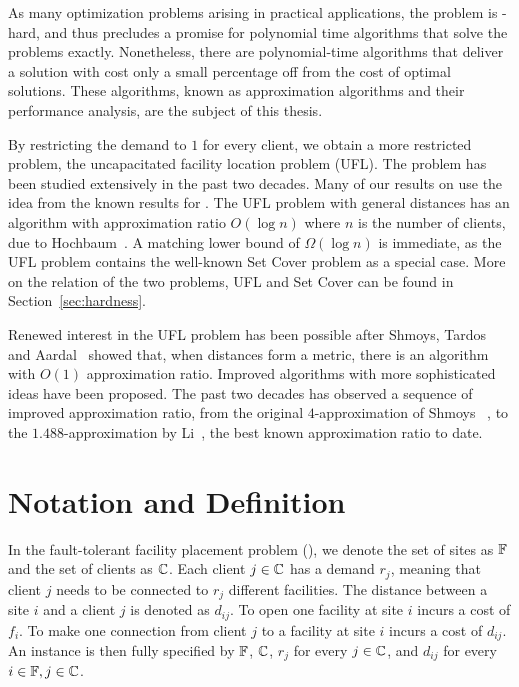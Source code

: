 \documentclass[oneside,final]{ucr}
\begin{document}
As many optimization problems arising in practical
applications, the {\FTFP} problem is \NP-hard, and thus
precludes a promise for polynomial time algorithms that
solve the problems exactly. Nonetheless, there are
polynomial-time algorithms that deliver a solution with cost
only a small percentage off from the cost of optimal
solutions. These algorithms, known as approximation
algorithms and their performance analysis, are the subject
of this thesis.

By restricting the demand to $1$ for every client, we obtain
a more restricted problem, the uncapacitated facility
location problem (UFL). The {\UFL} problem has been studied
extensively in the past two decades. Many of our results on
{\FTFP} use the idea from the known results for {\UFL}. The
UFL problem with general distances has an algorithm with
approximation ratio $O(\log n)$ where $n$ is the number of
clients, due to Hochbaum~\cite{Hochbaum82}. A matching lower
bound of $\Omega(\log n)$ is immediate, as the UFL problem
contains the well-known Set Cover problem as a special
case. More on the relation of the two problems, UFL and Set
Cover can be found in Section~\ref{sec:hardness}.

Renewed interest in the UFL problem has been possible after
Shmoys, Tardos and Aardal~\cite{ShmoysTA97} showed that,
when distances form a metric, there is an algorithm with
$O(1)$ approximation ratio. Improved algorithms with more
sophisticated ideas have been proposed. The past two decades
has observed a sequence of improved approximation ratio,
from the original $4$-approximation of Shmoys
{\etal}~\cite{ShmoysTA97}, to the $1.488$-approximation by
Li~\cite{Li11}, the best known approximation ratio to date.

\section{Notation and Definition}
In the fault-tolerant facility placement problem ({\FTFP}),
we denote the set of sites as $\mathbb{F}$ and the set of
clients as $\mathbb{C}$. Each client $j \in \mathbb{C}$ has
a demand $r_j$, meaning that client $j$ needs to be
connected to $r_j$ different facilities. The distance
between a site $i$ and a client $j$ is denoted as
$d_{ij}$. To open one facility at site $i$ incurs a cost of
$f_i$. To make one connection from client $j$ to a facility
at site $i$ incurs a cost of $d_{ij}$.  An {\FTFP} instance
is then fully specified by $\mathbb{F}$, $\mathbb{C}$, $r_j$
for every $j\in\mathbb{C}$, and $d_{ij}$ for every
$i\in\mathbb{F},j\in\mathbb{C}$.
\end{document}
